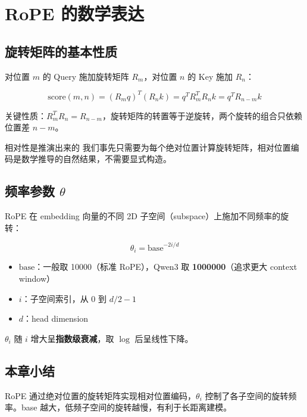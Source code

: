 \section{RoPE 的数学表达}

\subsection{旋转矩阵的基本性质}

对位置 $m$ 的 Query 施加旋转矩阵 $R_m$，对位置 $n$ 的 Key 施加 $R_n$：

$$
\text{score}(m, n) = (R_m q)^T (R_n k) = q^T R_m^T R_n k = q^T R_{n-m} k
$$

关键性质：$R_m^T R_n = R_{n-m}$，旋转矩阵的转置等于逆旋转，两个旋转的组合只依赖位置差 $n - m$。

\begin{warningbox}{相对性是推演出来的}
我们事先只需要为每个绝对位置计算旋转矩阵，相对位置编码是数学推导的自然结果，不需要显式构造。
\end{warningbox}

\subsection{频率参数 $\theta$}

RoPE 在 embedding 向量的不同 2D 子空间（subspace）上施加不同频率的旋转：

$$
\theta_i = \text{base}^{-2i/d}
$$

\begin{itemize}
  \item $\text{base}$：一般取 10000（标准 RoPE），Qwen3 取 \textbf{1000000}（追求更大 context window）
  \item $i$：子空间索引，从 0 到 $d/2 - 1$
  \item $d$：head dimension
\end{itemize}

$\theta_i$ 随 $i$ 增大呈\textbf{指数级衰减}，取 $\log$ 后呈线性下降。

\subsection{本章小结}

RoPE 通过绝对位置的旋转矩阵实现相对位置编码，$\theta_i$ 控制了各子空间的旋转频率。base 越大，低频子空间的旋转越慢，有利于长距离建模。

